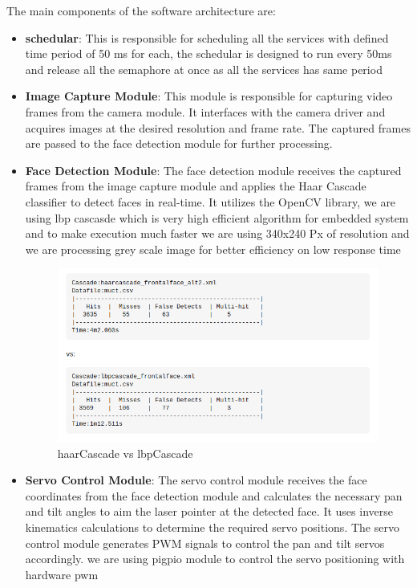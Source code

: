 \documentclass[a4paper,11pt]{article}%
\begin{document}
The main components of the software architecture are:
\begin{itemize}
    \item \textbf{schedular}: This is responsible for scheduling all the services with defined time period of 50 ms for each, the schedular is designed to run every 50ms and release all the semaphore at once as all the services has same period

    \item \textbf{Image Capture Module}: This module is responsible for capturing video frames from the camera module. It interfaces with the camera driver and acquires images at the desired resolution and frame rate. The captured frames are passed to the face detection module for further processing.


    \item \textbf{Face Detection Module}: The face detection module receives the captured frames from the image capture module and applies the Haar Cascade classifier to detect faces in real-time. It utilizes the OpenCV library, we are using lbp cascasde which is very high efficient algorithm for embedded system and to make execution much faster we are using 340x240 Px of resolution and we are processing grey scale image for better efficiency on low response time
          \begin{figure}[H]
              \centering
              \includegraphics[scale=0.6]{figures/haarcascade.png}
              \caption{haarCascade vs lbpCascade}
          \end{figure}


    \item \textbf{Servo Control Module}: The servo control module receives the face coordinates from the face detection module and calculates the necessary pan and tilt angles to aim the laser pointer at the detected face. It uses inverse kinematics calculations to determine the required servo positions. The servo control module generates PWM signals to control the pan and tilt servos accordingly. we are using pigpio module to control the servo positioning with hardware pwm


\end{itemize}
\end{document}
